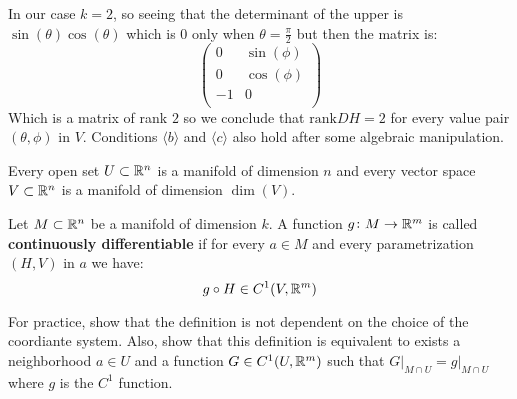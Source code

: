 \documentclass[11pt,a4paper]{article}
\begin{document}
	In our case $k = 2$, so seeing that the determinant of the upper
	is $\sin(\theta)\cos(\theta)$ which is $0$ only when 
	$\theta = \frac{\pi}{2}$ but then the matrix is:
	\[
		\begin{pmatrix}
		0 & \sin(\phi)\\
		0 & \cos(\phi)\\
		-1 & 0\\
		\end{pmatrix}
	\]
	Which is a matrix of rank $2$ so we conclude that $\mathrm{rank}DH = 2$
	for every value pair $(\theta,\phi)$ in $V$. Conditions 
	$\langle b \rangle$ and $\langle c \rangle$ also hold after some
	algebraic manipulation.
	\begin{remark}
		Every open set $U \subset \mathbb{R}^n$ is a manifold of dimension $n$
		and every vector space $V \subset \mathbb{R}^n$ is a manifold of dimension 
		$\dim(V)$.
	\end{remark}
	
	
	\begin{definition}
		Let $M \subset \mathbb{R}^n$ be a manifold of dimension $k$. A function
		$g \colon M \to \mathbb{R}^m$ is called \textbf{continuously differentiable}
		if for every $a \in M$ and every parametrization $(H,V)$ in $a$
		we have:
		\[
			g \circ H \in C^1(V, \mathbb{R}^m)
		\]
	\end{definition}
	\noindent
	For practice, show that the definition is not dependent on the choice of 
	the coordiante system. Also, show that this definition is equivalent to 
	exists a neighborhood $a \in U$ and a function $G \in C^1(U,\mathbb{R}^m)$ such 
	that  $G \vert_{M \cap U} = g \vert_{M \cap U}$ where $g$ is the $C^1$ 
	function.
	
	\newpage
	
\end{document}
